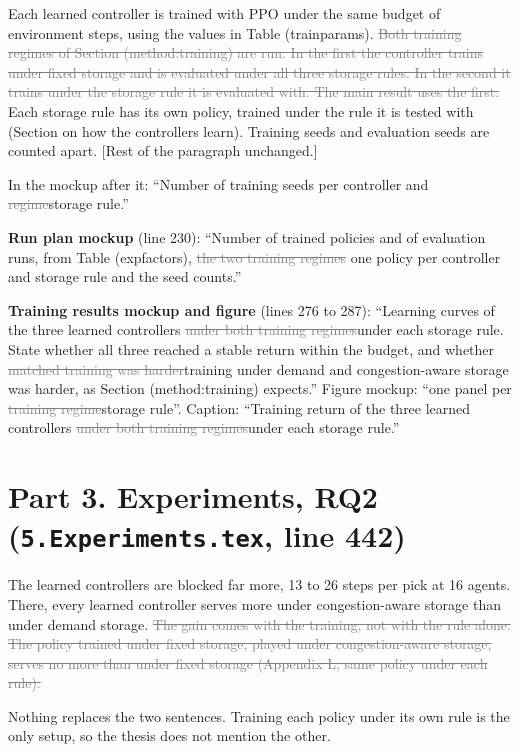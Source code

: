 \documentclass[11pt,a4paper]{article}
\newcommand{\new}[1]{\textcolor{newc}{#1}}
\newcommand{\old}[1]{\textcolor{gray}{\sout{#1}}}
\begin{document}
Each learned controller is trained with PPO under the same budget of
environment steps, using the values in Table (trainparams).
\old{Both training regimes of Section (method:training) are run. In the first
the controller trains under fixed storage and is evaluated under all three
storage rules. In the second it trains under the storage rule it is
evaluated with. The main result uses the first.}
\new{Each storage rule has its own policy, trained under the rule it is
tested with (Section on how the controllers learn).}
Training seeds and evaluation seeds are counted apart. [Rest of the
paragraph unchanged.]

In the mockup after it: ``Number of training seeds per controller and
\old{regime}\new{storage rule}.''

\textbf{Run plan mockup} (line 230): ``Number of trained policies and of
evaluation runs, from Table (expfactors), \old{the two training regimes}
\new{one policy per controller and storage rule} and the seed counts.''

\textbf{Training results mockup and figure} (lines 276 to 287):
``Learning curves of the three learned controllers \old{under both training
regimes}\new{under each storage rule}. State whether all three reached a
stable return within the budget, and whether \old{matched training was
harder}\new{training under demand and congestion-aware storage was harder},
as Section (method:training) expects.'' Figure mockup: ``one panel per
\old{training regime}\new{storage rule}''. Caption: ``Training return of the
three learned controllers \old{under both training regimes}\new{under each
storage rule}.''

\section*{Part 3. Experiments, RQ2 (\texttt{5.Experiments.tex}, line 442)}

The learned controllers are blocked far more, 13 to 26 steps per pick at 16
agents. There, every learned controller serves more under congestion-aware
storage than under demand storage.
\old{The gain comes with the training, not with the rule alone. The policy
trained under fixed storage, played under congestion-aware storage, serves
no more than under fixed storage (Appendix L, same policy under each rule).}

Nothing replaces the two sentences. Training each policy under its own rule
is the only setup, so the thesis does not mention the other.
\end{document}
